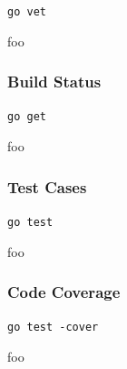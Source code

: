 \texttt{go vet}

foo

\subsubsection{Build Status}

\texttt{go get}

foo

\subsubsection{Test Cases}

\texttt{go test}

foo

\subsubsection{Code Coverage}

\texttt{go test -cover}

foo
